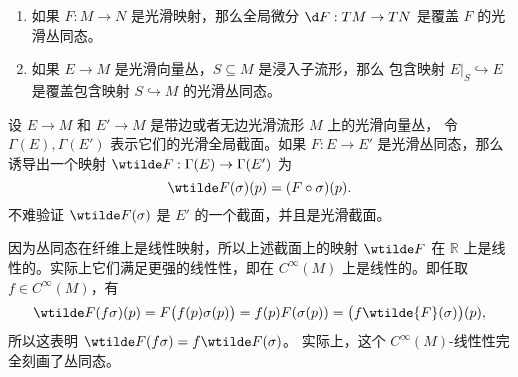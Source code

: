 \begin{example}[丛同态]
  \mbox{}
  \begin{enumerate}
    \item 如果 $F:M\to N$ 是光滑映射，那么全局微分 $\d F:TM\to TN$
    是覆盖 $F$ 的光滑丛同态。
    \item 如果 $E\to M$ 是光滑向量丛，$S\subseteq M$ 是浸入子流形，那么
    包含映射 $E|_S\hookrightarrow E$ 是覆盖包含映射 $S\hookrightarrow M$
    的光滑丛同态。
  \end{enumerate}
\end{example}

设 $E\to M$ 和 $E'\to M$ 是带边或者无边光滑流形 $M$ 上的光滑向量丛，
令 $\Gamma(E),\Gamma(E')$ 表示它们的光滑全局截面。如果
$F:E\to E'$ 是光滑丛同态，那么诱导出一个映射 $\wtilde F:\Gamma(E)\to\Gamma(E')$
为
\begin{equation}
  \wtilde F(\sigma)(p)=(F\circ\sigma)(p).
\end{equation}
不难验证 $\wtilde F(\sigma)$ 是 $E'$ 的一个截面，并且是光滑截面。

因为丛同态在纤维上是线性映射，所以上述截面上的映射 $\wtilde F$ 在
$\mathbb{R}$ 上是线性的。实际上它们满足更强的线性性，即在 $C^\infty(M)$
上是线性的。即任取 $f\in C^\infty(M)$，有
\[
  \wtilde F(f\sigma)(p)=F\bigl(f(p)\sigma(p)\bigr)
  =f(p)F(\sigma(p))=\bigl(f\wtilde{F}(\sigma)\bigr)(p),
\]
所以这表明 $\wtilde F(f\sigma)=f\wtilde F(\sigma)$。
实际上，这个 $C^\infty(M)$-线性性完全刻画了丛同态。

